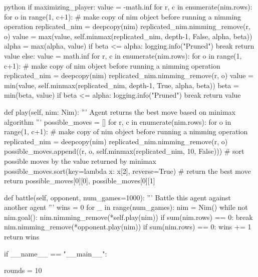 \begin{mintedbox}{python}
        if maximizing_player:
            value = -math.inf
            for r, c in enumerate(nim.rows):
                for o in range(1, c+1):
                    # make copy of nim object before running a nimming operation
                    replicated_nim = deepcopy(nim)
                    replicated_nim.nimming_remove(r, o)
                    value = max(value, self.minmax(replicated_nim, depth-1, False, alpha, beta))
                    alpha = max(alpha, value)
                    if beta <= alpha:
                        logging.info("Pruned")
                        break
            return value
        else:
            value = math.inf
            for r, c in enumerate(nim.rows):
                for o in range(1, c+1):
                    # make copy of nim object before running a nimming operation
                    replicated_nim = deepcopy(nim)
                    replicated_nim.nimming_remove(r, o)
                    value = min(value, self.minmax(replicated_nim, depth-1, True, alpha, beta))
                    beta = min(beta, value)
                    if beta <= alpha:
                        logging.info("Pruned")
                        break
            return value

    def play(self, nim: Nim):
        '''
        Agent returns the best move based on minimax algorithm
        '''
        possible_moves = []
        for r, c in enumerate(nim.rows):
            for o in range(1, c+1):
                # make copy of nim object before running a nimming operation
                replicated_nim = deepcopy(nim)
                replicated_nim.nimming_remove(r, o)
                possible_moves.append((r, o, self.minmax(replicated_nim, 10, False)))
        # sort possible moves by the value returned by minimax
        possible_moves.sort(key=lambda x: x[2], reverse=True)
        # return the best move
        return possible_moves[0][0], possible_moves[0][1]

    def battle(self, opponent, num_games=1000):
        '''
        Battle this agent against another agent
        '''
        wins = 0
        for _ in range(num_games):
            nim = Nim()
            while not nim.goal():
                nim.nimming_remove(*self.play(nim))
                if sum(nim.rows) == 0:
                    break
                nim.nimming_remove(*opponent.play(nim))
            if sum(nim.rows) == 0:
                wins += 1
        return wins

if __name__ == "__main__":

    rounds = 10


\end{mintedbox}
